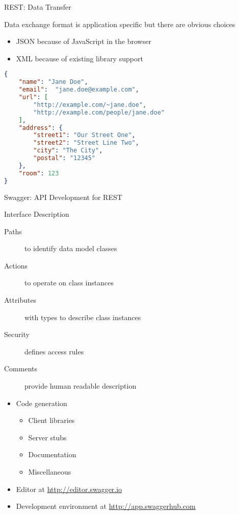 \begin{frame}[fragile]{REST: Data Transfer}

    Data exchange format is application specific but there are obvious choices
    \begin{itemize}
        \item JSON because of JavaScript in the browser
        \item XML because of existing library support
    \end{itemize}

\begin{lstlisting}[language=json,style=mini]
{
    "name": "Jane Doe",
    "email":  "jane.doe@example.com",
    "url": [
        "http://example.com/~jane.doe",
        "http://example.com/people/jane.doe"
    ],
    "address": {
        "street1": "Our Street One",
        "street2": "Street Line Two",
        "city": "The City",
        "postal": "12345"
    },
    "room": 123
}
\end{lstlisting}
\end{frame}


\begin{frame}{Swagger: API Development for REST}
    \begin{block}{Interface Description}
        \begin{description}
            \item[Paths] to identify data model classes
            \item[Actions] to operate on class instances
            \item[Attributes] with types to describe class instances
            \item[Security] defines access rules
            \item[Comments] provide human readable description
        \end{description}
    \end{block}

    \medskip

    \begin{itemize}
        \item Code generation
        \begin{itemize}
            \item Client libraries
            \item Server stubs
            \item Documentation
            \item Miscellaneous
        \end{itemize}
        \item Editor at \url{http://editor.swagger.io}
        \item Development environment at \url{http://app.swaggerhub.com}
    \end{itemize}
\end{frame}


